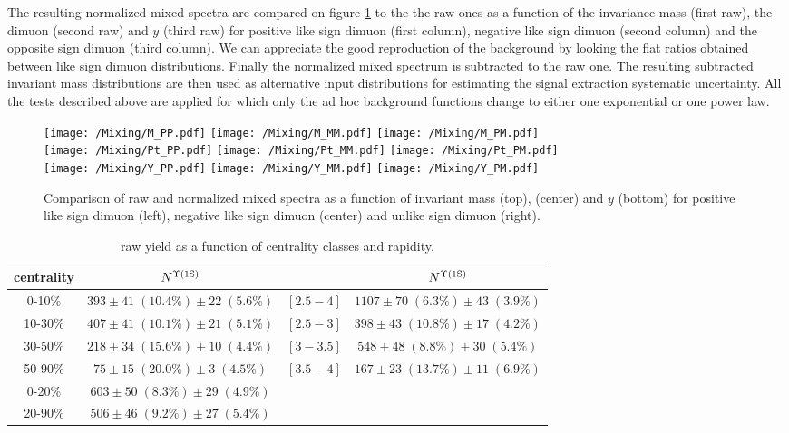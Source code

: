 The resulting normalized mixed spectra are compared on figure \ref{normalization} to the the raw ones as a function of the invariance mass (first raw), the dimuon \pt (second raw) and $y$ (third raw) for positive like sign dimuon (first column), negative like sign dimuon (second column) and the opposite sign dimuon (third column).
We can appreciate the good reproduction of the background  by looking the flat ratios obtained between like sign dimuon distributions.
Finally the normalized mixed spectrum is subtracted to the raw one.
The resulting  subtracted invariant mass distributions are then used as alternative input distributions for estimating the signal extraction systematic uncertainty.
All the tests described above are applied for which only the ad hoc background functions change to either one exponential or one power law.

\begin{figure}[!t]
\begin{center}
\texttt{[image: /Mixing/M\_PP.pdf]}
\texttt{[image: /Mixing/M\_MM.pdf]}
\texttt{[image: /Mixing/M\_PM.pdf]}\\
\texttt{[image: /Mixing/Pt\_PP.pdf]}
\texttt{[image: /Mixing/Pt\_MM.pdf]}
\texttt{[image: /Mixing/Pt\_PM.pdf]}\\
\texttt{[image: /Mixing/Y\_PP.pdf]}
\texttt{[image: /Mixing/Y\_MM.pdf]}
\texttt{[image: /Mixing/Y\_PM.pdf]}\\
\end{center}
\caption{\label{normalization}Comparison of raw and normalized mixed spectra as a function of invariant mass (top), \pt (center) and $y$ (bottom) for positive like sign dimuon (left), negative like sign dimuon (center) and unlike sign dimuon (right).}
\end{figure}

\begin{table}[!b]
  \centering
  \begin{tabular} { c | c | c | c}
    \hline
    centrality & $N^{\Upsilon\mathrm{(1S)}}$ &  \y & $N^{\Upsilon\mathrm{(1S)}}$ \\\hline
    0-10\% &  $ 393 \pm  41 \;(10.4\%) \pm  22 \;( 5.6\%) $   &  $[2.5-4]$ & $1107 \pm  70  \;( 6.3\%) \pm  43 \;( 3.9\%)$ \\
    10-30\% & $407 \pm  41 \;(10.1\%) \pm  21 \;( 5.1\%)$  & $[2.5-3]$ & $ 398 \pm 43 \;(10.8\%) \pm 17 \;(4.2\%) $ \\
    30-50\% & $ 218 \pm  34 \;(15.6\%) \pm  10 \;( 4.4\%) $ & $[3-3.5]$ & $ 548 \pm 48 \;(8.8\%) \pm 30 \;(5.4\%) $ \\
    50-90\% & $ 75 \pm  15 \;(20.0\%) \pm    3 \;( 4.5\%) $  & $[3.5-4]$ & $ 167 \pm 23 \;(13.7\%) \pm 11 \;(6.9\%) $ \\
    0-20\% & $ 603 \pm 50 \;(8.3\%) \pm 29 \;(4.9\%) $   &  & \\
    20-90\% & $ 506 \pm 46 \;(9.2\%) \pm 27 \;(5.4\%) $   &  & \\\hline
  \end{tabular}
  \caption{\label{NUps}\ups raw yield as a function of centrality classes and rapidity.} 
\end{table}


